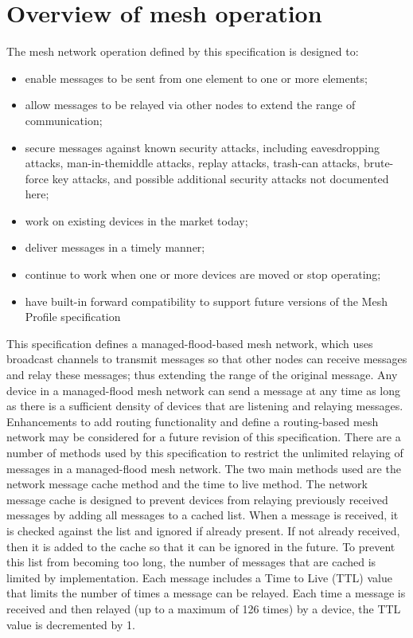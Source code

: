 \documentclass[\main/main.tex]{subfiles}
\begin{document}
\section{Overview of mesh operation}

The mesh network operation defined by this specification is designed to:
\begin{itemize}
    \item enable messages to be sent from one element to one or more elements;
    \item allow messages to be relayed via other nodes to extend the range of communication;
    \item secure messages against known security attacks, including eavesdropping attacks, man-in-themiddle attacks, replay attacks, trash-can attacks, brute-force key attacks, and possible additional security attacks not documented here;
    \item work on existing devices in the market today;
    \item deliver messages in a timely manner;
    \item continue to work when one or more devices are moved or stop operating;
    \item have built-in forward compatibility to support future versions of the Mesh Profile specification
\end{itemize}

This specification defines a managed-flood-based mesh network, which uses broadcast channels to
transmit messages so that other nodes can receive messages and relay these messages; thus extending
the range of the original message. Any device in a managed-flood mesh network can send a message at
any time as long as there is a sufficient density of devices that are listening and relaying messages.
Enhancements to add routing functionality and define a routing-based mesh network may be considered
for a future revision of this specification.
There are a number of methods used by this specification to restrict the unlimited relaying of messages in
a managed-flood mesh network. The two main methods used are the network message cache method
and the time to live method.
The network message cache is designed to prevent devices from relaying previously received messages
by adding all messages to a cached list. When a message is received, it is checked against the list and
ignored if already present. If not already received, then it is added to the cache so that it can be ignored in
the future. To prevent this list from becoming too long, the number of messages that are cached is limited
by implementation.
Each message includes a Time to Live (TTL) value that limits the number of times a message can be
relayed. Each time a message is received and then relayed (up to a maximum of 126 times) by a device,
the TTL value is decremented by 1.
\end{document}
